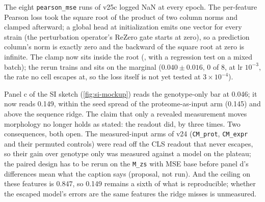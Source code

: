 

 The eight \texttt{pearson\_mse} runs of
v25c logged NaN at every epoch. The per-feature Pearson loss took the square root of the
product of two column norms and clamped afterward; a global head at initialization emits
one vector for every strain (the perturbation operator's ReZero gate starts at zero), so a
prediction column's norm is exactly zero and the backward of the square root at zero is
infinite. The clamp now sits inside the root (, with a
regression test on a mixed batch); the rerun trains and sits on the marginal ($0.040 \pm
0.016$, 0 of 8, at lr $10^{-3}$, the rate no cell escapes at, so the loss itself is not yet
tested at $3\times10^{-4}$).

 Panel c of the SI sketch (\cref{fig:si-mockup})
reads the genotype-only bar at 0.046; it now reads 0.149, within the seed spread of the
proteome-as-input arm (0.145) and above the sequence ridge. The claim that only a revealed
measurement moves morphology no longer holds as stated: the readout did, by three times.
Two consequences, both open. The measured-input arms of v24 (\texttt{CM\_prot},
\texttt{CM\_expr} and their permuted controls) were read off the CLS readout that never
escapes, so their gain over genotype only was measured against a model on the plateau; the
paired design has to be rerun on the \texttt{M\_zs} with MSE base before panel d's
differences mean what the caption says (proposal, not run). And the ceiling on these
features is 0.847, so 0.149 remains a sixth of what is reproducible; whether the escaped
model's errors are the same features the ridge misses is unmeasured.



